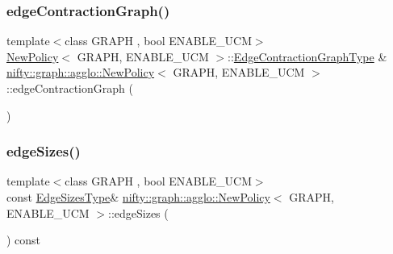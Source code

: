 \subsubsection{\texorpdfstring{edge\+Contraction\+Graph()}{edgeContractionGraph()}}
{\footnotesize\ttfamily template$<$class G\+R\+A\+PH , bool E\+N\+A\+B\+L\+E\+\_\+\+U\+CM$>$ \\
\hyperlink{classnifty_1_1graph_1_1agglo_1_1NewPolicy}{New\+Policy}$<$ G\+R\+A\+PH, E\+N\+A\+B\+L\+E\+\_\+\+U\+CM $>$\+::\hyperlink{classnifty_1_1graph_1_1agglo_1_1NewPolicy_a704192e6cafc4bfba6071564ea52e17c}{Edge\+Contraction\+Graph\+Type} \& \hyperlink{classnifty_1_1graph_1_1agglo_1_1NewPolicy}{nifty\+::graph\+::agglo\+::\+New\+Policy}$<$ G\+R\+A\+PH, E\+N\+A\+B\+L\+E\+\_\+\+U\+CM $>$\+::edge\+Contraction\+Graph (\begin{DoxyParamCaption}{ }\end{DoxyParamCaption})\hspace{0.3cm}{\ttfamily [inline]}}

\mbox{\label{classnifty_1_1graph_1_1agglo_1_1NewPolicy_acf3ea1c58fa6f0da63eba6c8d1ecb3ff}} 
\subsubsection{\texorpdfstring{edge\+Sizes()}{edgeSizes()}}
{\footnotesize\ttfamily template$<$class G\+R\+A\+PH , bool E\+N\+A\+B\+L\+E\+\_\+\+U\+CM$>$ \\
const \hyperlink{classnifty_1_1graph_1_1agglo_1_1NewPolicy_ae2cee465b05f3ba70c44b2769e8bc750}{Edge\+Sizes\+Type}\& \hyperlink{classnifty_1_1graph_1_1agglo_1_1NewPolicy}{nifty\+::graph\+::agglo\+::\+New\+Policy}$<$ G\+R\+A\+PH, E\+N\+A\+B\+L\+E\+\_\+\+U\+CM $>$\+::edge\+Sizes (\begin{DoxyParamCaption}{ }\end{DoxyParamCaption}) const\hspace{0.3cm}{\ttfamily [inline]}}

\mbox{\label{classnifty_1_1graph_1_1agglo_1_1NewPolicy_a81e86b1d68aaf96fec449c9663ba7b54}} 
